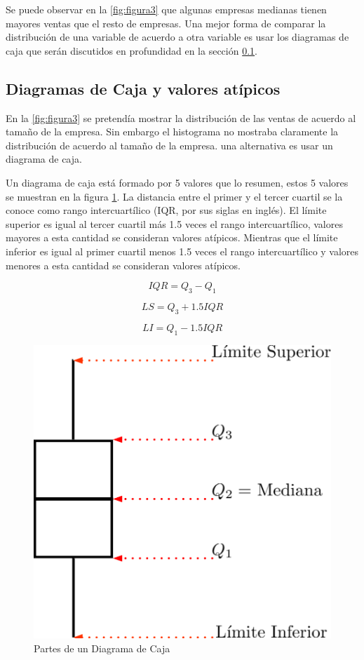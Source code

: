 \documentclass[]{book}
\begin{document}
Se puede observar en la \ref{fig:figura3} que algunas empresas medianas
tienen mayores ventas que el resto de empresas. Una mejor forma de
comparar la distribución de una variable de acuerdo a otra variable es
usar los diagramas de caja que serán discutidos en profundidad en la
sección \ref{boxes}.

\subsection{Diagramas de Caja y valores atípicos}\label{boxes}

En la \ref{fig:figura3} se pretendía mostrar la distribución de las
ventas de acuerdo al tamaño de la empresa. Sin embargo el histograma no
mostraba claramente la distribución de acuerdo al tamaño de la empresa.
una alternativa es usar un diagrama de caja.

Un diagrama de caja está formado por 5 valores que lo resumen, estos 5
valores se muestran en la figura \ref{fig:caja1}. La distancia entre el
primer y el tercer cuartil se la conoce como rango intercuartílico (IQR,
por sus siglas en inglés). El límite superior es igual al tercer cuartil
más 1.5 veces el rango intercuartílico, valores mayores a esta cantidad
se consideran valores atípicos. Mientras que el límite inferior es igual
al primer cuartil menos 1.5 veces el rango intercuartílico y valores
menores a esta cantidad se consideran valores atípicos.

\begin{equation} 
  IQR = Q_3 - Q_1
  \label{eq:iqr}
\end{equation}

\begin{equation} 
  LS = Q_3 + 1.5IQR
  \label{eq:ls}
\end{equation}

\begin{equation} 
  LI = Q_1 - 1.5IQR
  \label{eq:li}
\end{equation}

\begin{figure}[h]

{\centering \includegraphics[width=0.4\linewidth]{boxplot3} 

}

\caption{Partes de un Diagrama de Caja}\label{fig:caja1}
\end{figure}
\end{document}
